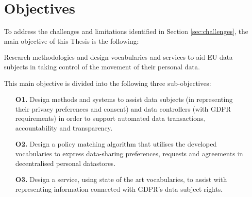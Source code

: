 \section{Objectives}
\label{sec:objectives}

To address the challenges and limitations identified in Section \ref{sec:challenges}, the main objective of this Thesis is the following:

\begin{tcolorbox}[colback=royallavender!20]
Research methodologies and design vocabularies and services to aid EU data subjects in taking control of the movement of their personal data.
\end{tcolorbox}

This main objective is divided into the following three sub-objectives:

\begin{enumerate}
    \item [\textbf{O1.}] Design methods and systems to assist data subjects (in representing their privacy preferences and consent) and data controllers (with GDPR requirements) in order to support automated data transactions, accountability and transparency.
    \item [\textbf{O2.}] Design a policy matching algorithm that utilises the developed vocabularies to express data-sharing preferences, requests and agreements in decentralised personal datastores.
    \item [\textbf{O3.}] Design a service, using state of the art vocabularies, to assist with representing information connected with GDPR’s data subject rights.
\end{enumerate}